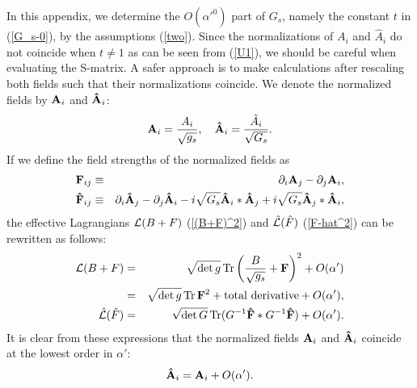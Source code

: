 \documentclass[a4paper,12pt]{article}
\begin{document}
In this appendix, we determine the $O(\alpha'^0)$ part of $G_s$,
namely the constant $t$ in (\ref{G_s-0}), by the assumptions
(\ref{two}).
Since the normalizations of $A_i$ and $\hat{A}_i$
do not coincide when $t \ne 1$ as can be seen from (\ref{U1}),
we should be careful when evaluating the S-matrix.
A safer approach is to make calculations after
rescaling both fields such that their normalizations coincide.
We denote the normalized fields
by ${\bf A}_i$ and ${\bf \hat{A}}_i$:
\begin{equation}
{\bf A}_i = \frac{A_i}{\sqrt{g_s}}, \quad
{\bf \hat{A}}_i = \frac{\hat{A}_i}{\sqrt{G_s}}.
\end{equation}
If we define the field strengths of the normalized fields as
\begin{eqnarray}
{\bf F}_{ij} &\equiv&
\partial_i {\bf A}_j - \partial_j {\bf A}_i, \\
{\bf \hat{F}}_{ij} &\equiv&
\partial_i {\bf \hat{A}}_j - \partial_j {\bf \hat{A}}_i
-i \sqrt{G_s} {\bf \hat{A}}_i \ast {\bf \hat{A}}_j
+i \sqrt{G_s} {\bf \hat{A}}_j \ast {\bf \hat{A}}_i,
\end{eqnarray}
the effective Lagrangians ${\cal L} (B+F)$ (\ref{(B+F)^2})
and $\hat{{\cal L}} (\hat{F})$ (\ref{F-hat^2})
can be rewritten as follows:
\begin{eqnarray}
{\cal L} (B+F) &=&
\sqrt{\det g} \, {\rm Tr}
\left( \frac{B}{\sqrt{g_s}} + {\bf F} \right)^2
+ O(\alpha') \nonumber \\
&=& \sqrt{\det g} \, {\rm Tr} \, {\bf F}^2
+ {\rm total~derivative} + O(\alpha'), \\
\hat{{\cal L}} (\hat{F}) &=&
\sqrt{\det G} \, {\rm Tr}
( G^{-1} {\bf \hat{F}} \ast G^{-1} {\bf \hat{F}} )
+ O(\alpha').
\end{eqnarray}
It is clear from these expressions that
the normalized fields ${\bf A}_i$ and ${\bf \hat{A}}_i$
coincide at the lowest order in $\alpha'$:
\begin{equation}
{\bf \hat{A}}_i = {\bf A}_i + O(\alpha').
\end{equation}
\end{document}
